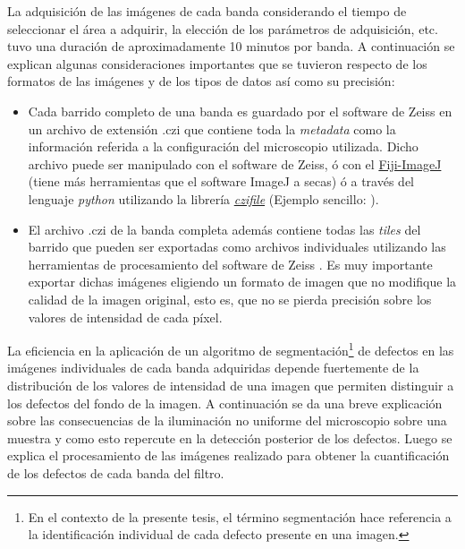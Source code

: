 La adquisición de las imágenes de cada banda considerando el tiempo de seleccionar el área a adquirir, la elección de los parámetros de adquisición, etc. tuvo una duración de aproximadamente 10 minutos por banda. A continuación se explican algunas consideraciones importantes que se tuvieron respecto de los formatos de las imágenes y de los tipos de datos así como su precisión:
\begin{itemize}
\justifying
\item Cada barrido completo de una banda es guardado por el software de Zeiss en un archivo de extensión .czi que contiene toda la \textit{metadata} como la información referida a la configuración del microscopio utilizada. Dicho archivo puede ser manipulado con el software de Zeiss, ó con el \href{https://imagej.net/Fiji}{Fiji-ImageJ} (tiene más herramientas que el software ImageJ a secas) ó a través del lenguaje \textit{python} utilizando la librería \href{https://pypi.org/project/czifile/}{\textit{czifile}} (Ejemplo sencillo: \href{https://github.com/jrr1984/defects_analysis/blob/master/zeiss_cfi.ipynb}{\faGithub}).
\item El archivo .czi de la banda completa además contiene todas las \textit{tiles} del barrido que pueden ser exportadas como archivos individuales utilizando las herramientas de procesamiento del software de Zeiss \cite{tilezeiss}. Es muy importante exportar dichas imágenes eligiendo un formato de imagen que no modifique la calidad de la imagen original, esto es, que no se pierda precisión sobre los valores de intensidad de cada píxel. 
\end{itemize}

La eficiencia en la aplicación de un algoritmo de segmentación\footnote{En el contexto de la presente tesis, el término segmentación hace referencia a la identificación individual de cada defecto presente en una imagen.} de defectos en las imágenes individuales de cada banda adquiridas depende fuertemente de la distribución de los valores de intensidad de una imagen que permiten distinguir a los defectos del fondo de la imagen. A continuación se da una breve explicación sobre las consecuencias de la iluminación no uniforme del microscopio sobre una muestra y como esto repercute en la detección posterior de los defectos. Luego se explica el procesamiento de las imágenes realizado para obtener la cuantificación de los defectos de cada banda del filtro.

\singlespacing
